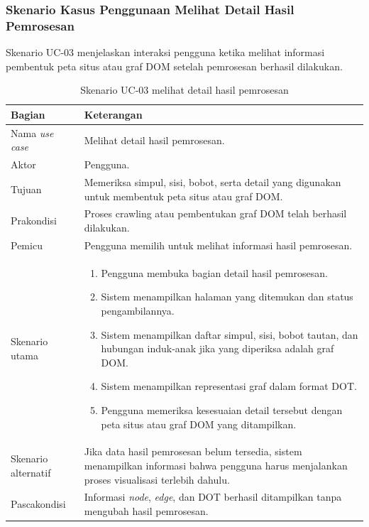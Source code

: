 \subsubsection{Skenario Kasus Penggunaan Melihat Detail Hasil Pemrosesan}
Skenario UC-03 menjelaskan interaksi pengguna ketika melihat informasi pembentuk peta situs atau graf DOM setelah pemrosesan berhasil dilakukan.

\begin{longtable}{|p{}|p{}|}
    \caption{Skenario UC-03 melihat detail hasil pemrosesan}\label{tab:skenario-uc03} \\
    \hline
    \textbf{Bagian} & \textbf{Keterangan} \\ \hline
    Nama \textit{use case} & Melihat detail hasil pemrosesan. \\ \hline
    Aktor & Pengguna. \\ \hline
    Tujuan & Memeriksa simpul, sisi, bobot, serta detail yang digunakan untuk membentuk peta situs atau graf DOM. \\ \hline
    Prakondisi & Proses crawling atau pembentukan graf DOM telah berhasil dilakukan. \\ \hline
    Pemicu & Pengguna memilih untuk melihat informasi hasil pemrosesan. \\ \hline
    Skenario utama &
    \begin{enumerate}[leftmargin=*, itemsep=0pt, topsep=0pt]
        \item Pengguna membuka bagian detail hasil pemrosesan.
        \item Sistem menampilkan halaman yang ditemukan dan status pengambilannya.
        \item Sistem menampilkan daftar simpul, sisi, bobot tautan, dan hubungan induk-anak jika yang diperiksa adalah graf DOM.
        \item Sistem menampilkan representasi graf dalam format DOT.
        \item Pengguna memeriksa kesesuaian detail tersebut dengan peta situs atau graf DOM yang ditampilkan.
    \end{enumerate} \\ \hline
    Skenario alternatif & Jika data hasil pemrosesan belum tersedia, sistem menampilkan informasi bahwa pengguna harus menjalankan proses visualisasi terlebih dahulu. \\ \hline
    Pascakondisi & Informasi \textit{node}, \textit{edge}, dan DOT berhasil ditampilkan tanpa mengubah hasil pemrosesan. \\ \hline
\end{longtable}

